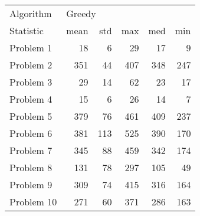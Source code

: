 \begin{tabular}{lrrrrr}
\toprule
Algorithm & \multicolumn{5}{l}{Greedy} \\
Statistic &   mean &  std &  max &  med &  min \\
\midrule
Problem 1  &     18 &    6 &   29 &   17 &    9 \\
Problem 2  &    351 &   44 &  407 &  348 &  247 \\
Problem 3  &     29 &   14 &   62 &   23 &   17 \\
Problem 4  &     15 &    6 &   26 &   14 &    7 \\
Problem 5  &    379 &   76 &  461 &  409 &  237 \\
Problem 6  &    381 &  113 &  525 &  390 &  170 \\
Problem 7  &    345 &   88 &  459 &  342 &  174 \\
Problem 8  &    131 &   78 &  297 &  105 &   49 \\
Problem 9  &    309 &   74 &  415 &  316 &  164 \\
Problem 10 &    271 &   60 &  371 &  286 &  163 \\
\bottomrule
\end{tabular}
